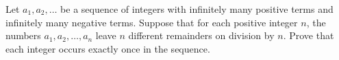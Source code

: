 Let $a_1, a_2, \ldots$ be a sequence of integers with infinitely many positive terms and infinitely many negative terms. Suppose that for each positive integer $n$, the numbers $a_1, a_2, \ldots, a_n$ leave $n$ different remainders on division by $n$. Prove that each integer occurs exactly once in the sequence.
